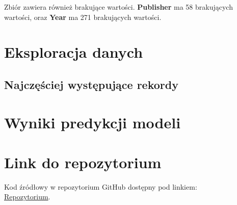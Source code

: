 \documentclass[11pt]{article}
\begin{document}
Zbiór zawiera również brakujące wartości.
\textbf{Publisher} ma 58 brakujących wartości, oraz
\textbf{Year} ma 271 brakujących wartości.

\section{Eksploracja danych}\label{sec:eksploracja-danych}

\subsection{Najczęściej występujące rekordy}\label{subsec:najczesciej-wystepujace-rekordy}


\section{Wyniki predykcji modeli}\label{sec:wyniki-predykcji-modeli}


\section{Link do repozytorium}\label{sec:link-do-repo}
Kod źródłowy w repozytorium GitHub dostępny pod linkiem: \\
\href{https://github.com/KotZPolibudy/PUT_SUS/zdataset-analiza}{Repozytorium}.
\end{document}
